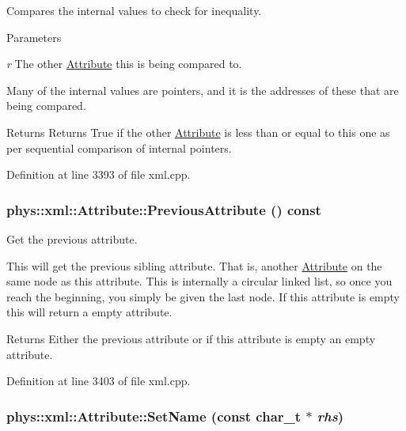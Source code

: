 Compares the internal values to check for inequality. 


\begin{DoxyParams}{Parameters}
\item[{\em r}]The other \hyperlink{classphys_1_1xml_1_1Attribute}{Attribute} this is being compared to.\end{DoxyParams}
Many of the internal values are pointers, and it is the addresses of these that are being compared. \begin{DoxyReturn}{Returns}
Returns True if the other \hyperlink{classphys_1_1xml_1_1Attribute}{Attribute} is less than or equal to this one as per sequential comparison of internal pointers. 
\end{DoxyReturn}


Definition at line 3393 of file xml.cpp.

\hypertarget{classphys_1_1xml_1_1Attribute_a02fa8a573b2adf5142d363d6eb95e1d5}{
\subsubsection[{PreviousAttribute}]{\setlength{\rightskip}{0pt plus 5cm}phys::xml::Attribute::PreviousAttribute () const}}
\label{da/ddf/classphys_1_1xml_1_1Attribute_a02fa8a573b2adf5142d363d6eb95e1d5}


Get the previous attribute. 

This will get the previous sibling attribute. That is, another \hyperlink{classphys_1_1xml_1_1Attribute}{Attribute} on the same node as this attribute. This is internally a circular linked list, so once you reach the beginning, you simply be given the last node. If this attribute is empty this will return a empty attribute. \begin{DoxyReturn}{Returns}
Either the previous attribute or if this attribute is empty an empty attribute. 
\end{DoxyReturn}


Definition at line 3403 of file xml.cpp.

\hypertarget{classphys_1_1xml_1_1Attribute_af669654308122897f98858563375bf4c}{
\subsubsection[{SetName}]{\setlength{\rightskip}{0pt plus 5cm}phys::xml::Attribute::SetName (const char\_\-t $\ast$ {\em rhs})}}
\label{da/ddf/classphys_1_1xml_1_1Attribute_af669654308122897f98858563375bf4c}


